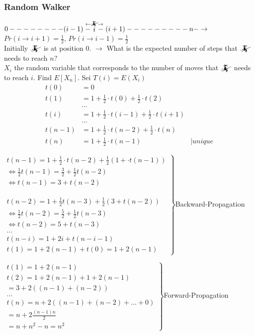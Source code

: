 \subsubsection{Random Walker} $0--------(i-1)\stackrel{\leftarrow}{-}\stackrel{\mathwitch}{i}\stackrel{\rightarrow}{-}(i+1)---------n-\rightarrow $ \\
$Pr(i \rightarrow i+1) = \frac{1}{2}$, $Pr(i \rightarrow i-1) = \frac{1}{2}$ \\
Initially $\mathwitch$ is at position 0. $\rightarrow$ What is the expected number of steps that $\mathwitch$ needs to reach $n$? \\
$X_i$ the random variable that corresponds to the number of moves that $\mathwitch$ needs to reach $i$. Find $E[X_n]$. Sei $T(i) = E(X_i)$ \\
\begin{align*}
	t(0) &= 0 \\
	t(1) &= 1 + \frac{1}{2} \cdot t(0) + \frac{1}{2} \cdot t(2) \\
	&... \\
	t(i) &= 1 + \frac{1}{2} \cdot t(i-1) + \frac{1}{2} \cdot t(i+1) \\
	&... \\
	t(n-1) &= 1 + \frac{1}{2} \cdot t(n-2) + \frac{1}{2} \cdot t(n) \\
	t(n) &= 1 + \frac{1}{2} \cdot t(n-1) & |unique
\end{align*}
\begin{center}
    $\left.\begin{aligned}
t(n-1) = 1 + \frac{1}{2} \cdot t(n-2) + \frac{1}{2} (1 + \cdot t(n-1)) \\
\Leftrightarrow \frac{1}{2} t(n-1) = \frac{3}{2} +  \frac{1}{2}t(n-2) \\
\Leftrightarrow t(n-1) = 3 + t(n-2) \\ \phantom{t} \\ 
t(n-2) = 1+\frac{1}{2}t(n-3) + \frac{1}{2} (3+t(n-2)) \\
\Leftrightarrow \frac{1}{2}t(n-2) = \frac{5}{2} + \frac{1}{2} t(n-3) \\
\Leftrightarrow t(n-2) = 5 + t(n-3) \\ ... \\
t(n-i) = 1 + 2i + t(n-i-1) \\
t(1) = 1 + 2 (n-1) + t(0) = 1 + 2(n-1)
\end{aligned}\right\rbrace$Backward-Propagation
\end{center}
\begin{center}
	$\left.\begin{aligned}
	t(1) = 1 + 2(n-1) \\
	t(2) = 1 + 2(n-1) + 1 + 2(n-1)  \\ = 3 + 2((n-1)+(n-2)) \\
	... \\
	t(n) = n + 2((n-1)+(n-2)+...+0) \\
	= n+2 \frac{(n-1)n}{2}  \\= n + n^2 - n = n^2
	\end{aligned}\right\rbrace$Forward-Propagation
\end{center}

